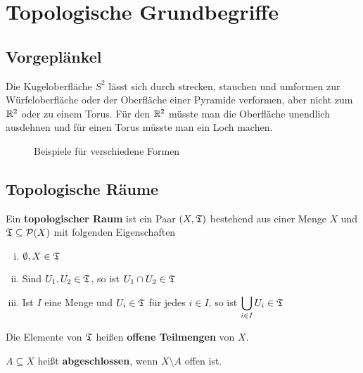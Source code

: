 \chapter{Topologische Grundbegriffe}
\section{Vorgeplänkel}
    Die Kugeloberfläche $S^2$ lässt sich durch strecken, stauchen
    und umformen zur Würfeloberfläche oder
    der Oberfläche einer Pyramide verformen, aber nicht zum $\mdr^2$
    oder zu einem Torus. Für den $\mdr^2$ müsste man die Oberfläche
    unendlich ausdehnen und für einen Torus müsste man ein Loch machen.

    \begin{figure}[ht]
        \centering
        \subfigure[$S^2$]{
            
            \label{fig:s2}
        }%
        \subfigure[Würfel]{
            
            \label{fig:cube}
        }%
        \subfigure[Pyramide]{
            
            \label{fig:pyramide}
        }

        \subfigure[$\mdr^2$]{
            
            \label{fig:pyramide}
        }%
        \label{Formen}
        \caption{Beispiele für verschiedene Formen}
    \end{figure}

\section{Topologische Räume}
\begin{definition}   
    Ein \textbf{topologischer Raum} ist ein Paar $(X, \mathfrak{T})$ bestehend
    aus einer Menge $X$ und $\mathfrak{T} \subseteq \mathcal{P}(X)$ mit
    folgenden Eigenschaften
    \begin{enumerate}[(i)]
        \item $\emptyset, X \in \mathfrak{T}$
        \item Sind $U_1, U_2 \in \mathfrak{T}$, so ist $U_1 \cap U_2 \in \mathfrak{T}$
        \item Ist $I$ eine Menge und $U_i \in \mathfrak{T}$ für jedes $i \in I$,
              so ist $\displaystyle \bigcup_{i \in I} U_i \in \mathfrak{T}$
    \end{enumerate}
    Die Elemente von $\mathfrak{T}$ heißen \textbf{offene Teilmengen} von $X$. 

    $A \subseteq X$ heißt \textbf{abgeschlossen}, wenn $X \setminus A$ offen ist.

\end{definition}

